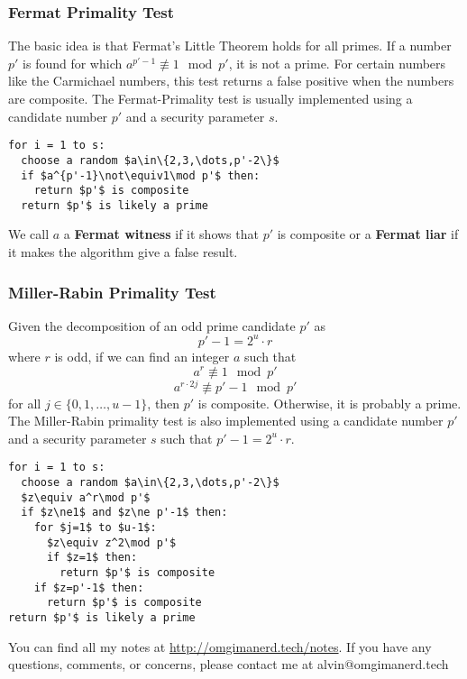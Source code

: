 \documentclass{math}
\begin{document}
\subsubsection*{Fermat Primality Test}
The basic idea is that Fermat's Little Theorem holds for all primes. If a
number \( p' \) is found for which \( a^{p'-1}\not\equiv1\mod p' \), it is not a
prime. For certain numbers like the Carmichael numbers, this test returns a
false positive when the numbers are composite. The Fermat-Primality test is
usually implemented using a candidate number \( p' \) and a security parameter
\( s \).
\begin{lstlisting}[mathescape=true]
for i = 1 to s:
  choose a random $a\in\{2,3,\dots,p'-2\}$
  if $a^{p'-1}\not\equiv1\mod p'$ then:
    return $p'$ is composite
  return $p'$ is likely a prime
\end{lstlisting}
We call \( a \) a \textbf{Fermat witness} if it shows that \( p' \) is composite
or a \textbf{Fermat liar} if it makes the algorithm give a false result.

\subsubsection*{Miller-Rabin Primality Test}
Given the decomposition of an odd prime candidate \( p' \) as
\[ p'-1 = 2^u\cdot r \]
where \( r \) is odd, if we can find an integer \( a \) such that
\[ a^r\not\equiv1\mod p' \]
\[ a^{r\cdot2j}\not\equiv p'-1\mod p' \]
for all \( j\in\{0,1,\dots,u-1\} \), then \( p' \) is composite. Otherwise, it
is probably a prime. The Miller-Rabin primality test is also implemented
using a candidate number \( p' \) and a security parameter \( s \) such that
\( p'-1 = 2^u\cdot r \).
\begin{lstlisting}[mathescape=true]
for i = 1 to s:
  choose a random $a\in\{2,3,\dots,p'-2\}$
  $z\equiv a^r\mod p'$
  if $z\ne1$ and $z\ne p'-1$ then:
    for $j=1$ to $u-1$:
      $z\equiv z^2\mod p'$
      if $z=1$ then:
        return $p'$ is composite
    if $z=p'-1$ then:
      return $p'$ is composite
return $p'$ is likely a prime
\end{lstlisting}

\begin{center}
  You can find all my notes at \url{http://omgimanerd.tech/notes}. If you have
  any questions, comments, or concerns, please contact me at
  alvin@omgimanerd.tech
\end{center}
\end{document}
